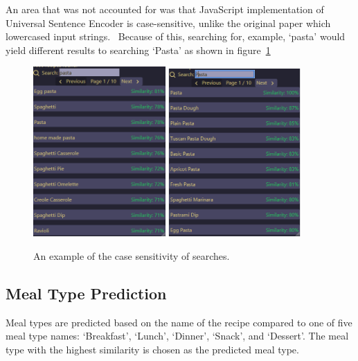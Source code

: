 An area that was not accounted for was that JavaScript implementation of Universal Sentence Encoder is case-sensitive, unlike
the original paper which lowercased input strings.~\cite{cer_universal_2018} Because of this, searching for, example, \enquote*{pasta}
would yield different results to searching \enquote*{Pasta} as shown in figure~\ref{fig:search_case_sensitive}

\begin{figure}[p]
    \centering
    \caption{\label{fig:search_case_sensitive}An example of the case sensitivity of searches.}
    \includegraphics[width=0.45\textwidth]{figures/search_lower.png}
    \includegraphics[width=0.45\textwidth]{figures/search_upper.png}
\end{figure}

\clearpage\subsection{Meal Type Prediction}
Meal types are predicted based on the name of the recipe compared to one of five meal type names: \enquote*{Breakfast},
\enquote*{Lunch}, \enquote*{Dinner}, \enquote*{Snack}, and \enquote*{Dessert}. The meal type with the highest similarity
is chosen as the predicted meal type.

